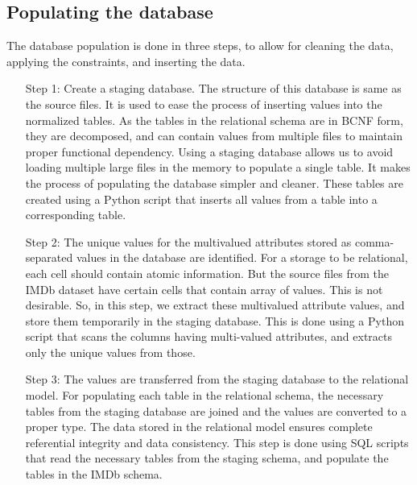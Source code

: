 \documentclass{sig-alternate}
\begin{document}
	\subsection{Populating the database}
        The database population is done in three steps, to allow for cleaning the data, applying the constraints, and inserting the data.
        \begin{enumerate}
                \item[Step 1:] Create a staging database. The structure of this database is same as the source files. It is used to ease the process of inserting values into the normalized tables. As the tables in the relational schema are in BCNF form, they are decomposed, and can contain values from multiple files to maintain proper functional dependency. Using a staging database allows us to avoid loading multiple large files in the memory to populate a single table. It makes the process of populating the database simpler and cleaner. These tables are created using a Python script that inserts all values from a table into a corresponding table.

                \item[Step 2:] The unique values for the multivalued attributes stored as comma-separated values in the database are identified. For a storage to be relational, each cell should contain atomic information. But the source files from the IMDb dataset have certain cells that contain array of values. This is not desirable. So, in this step, we extract these multivalued attribute values, and store them temporarily in the staging database. This is done using a Python script that scans the columns having multi-valued attributes, and extracts only the unique values from those.

                \item[Step 3:] The values are transferred from the staging database to the relational model. For populating each table in the relational schema, the necessary tables from the staging database are joined and the values are converted to a proper type. The data stored in the relational model ensures complete referential integrity and data consistency. This step is done using SQL scripts that read the necessary tables from the staging schema, and populate the tables in the IMDb schema.
        \end{enumerate}
\bigskip
\end{document}
